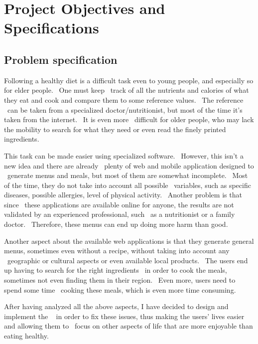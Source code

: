 \usepackage{graphicx}


\chapter{Project Objectives and Specifications}
\label{ch:specification}

\section{Problem specification}
\label{sec:specification-specification}
Following a healthy diet is a difficult task even to young people, and especially so for elder people. \
One must keep \
track of all the nutrients and calories of what they eat and cook and compare them to some reference values. \
The reference \
can be taken from a specialized doctor/nutritionist, but most of the time it's taken from the internet. \
It is even more \
difficult for older people, who may lack the mobility to search for what they need or even read the finely printed ingredients.

This task can be made easier using specialized software. \
However, this isn't a new idea and there are already \
plenty of web and mobile application designed to \
generate menus and meals, but most of them are somewhat incomplete. \
Most of the time, they do not take into account all possible \
variables, such as specific diseases, possible allergies, level of physical activity. \
Another problem is that since \
these applications are available online for anyone, the results are not validated by an experienced professional, such \
as a nutritionist or a family doctor. \
Therefore, these menus can end up doing more harm than good.

Another aspect about the available web applications is that they generate general menus, sometimes even without a recipe,
without taking into account any \
geographic or cultural aspects or even available local products. \
The users end up having to search for the right ingredients \
in order to cook the meals, sometimes not even finding them in their region. \
Even more, users need to spend some time \
cooking these meals, which is even more time consuming.

After having analyzed all the above aspects, I have decided to design and implement the \
\applicationTitle{} in order to fix these issues, thus making the users' lives easier and allowing them to \
focus on other aspects of life that are more enjoyable than eating healthy.


